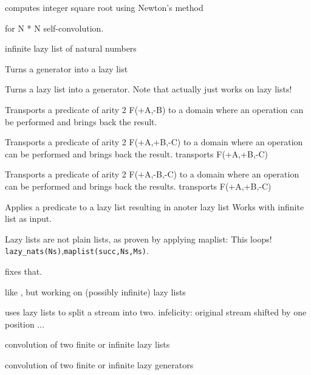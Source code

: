 \documentclass[11pt]{article}
\begin{document}
\begin{description}
computes integer square root using Newton's method

 for N * N self-convolution.

infinite lazy list of natural numbers

Turns a generator into a lazy list 

Turns a lazy list into a generator.
Note that  actually just works on lazy lists!

Transports a predicate of arity 2 F(+A,-B) to a domain where
an operation can be performed and brings back the result.

Transports a predicate of arity 2 F(+A,+B,-C) to a domain where
an operation can be performed and brings back the result.
transports F(+A,+B,-C) 

Transports a predicate of arity 2 F(+A,-B,-C) to a domain where
an operation can be performed and brings back the results.
transports F(+A,+B,-C) 

Applies a predicate to a lazy list resulting in anoter lazy list
Works with infinite list as input.

Lazy lists are not plain lists, as proven by applying maplist:
This loops!
\Sdirective{}\verb$lazy_nats(Ns)$,\verb$maplist(succ,Ns,Ms)$.

 fixes that.

like , but working on (possibly infinite) lazy lists

 uses lazy lists to split a stream into two.
infelicity: original stream shifted by one position ...

convolution of two finite or infinite lazy lists

convolution of two finite or infinite lazy generators


\end{description}
\end{document}
